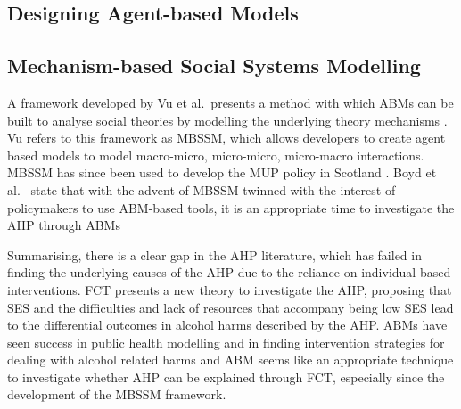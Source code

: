 \subsection{Designing Agent-based Models}



\subsection{Mechanism-based Social Systems Modelling}
A framework developed by Vu et al.~presents a method with which \ac{ABM}s can be built to analyse social theories by modelling the underlying theory mechanisms \cite{MBSSM}. Vu refers to this framework as \ac{MBSSM}, which allows developers to create agent based models to model macro-micro, micro-micro, micro-macro interactions. \ac{MBSSM} has since been used to develop the \ac{MUP} policy in Scotland \cite{mbssmCommentary, scotlandMUP}. Boyd et al.~ state that with the advent of \ac{MBSSM} twinned with the interest of policymakers to use \ac{ABM}-based tools, it is an appropriate time to investigate the \ac{AHP} through \ac{ABM}s \cite{Boyd2022, sipherIntro}

Summarising, there is a clear gap in the \ac{AHP} literature, which has failed in finding the underlying causes of the \ac{AHP} due to the reliance on individual-based interventions. \ac{FCT} presents a new theory to investigate the \ac{AHP},  proposing that \ac{SES} and the difficulties and lack of resources that accompany being low \ac{SES} lead to the differential outcomes in alcohol harms described by the \ac{AHP}. \ac{ABM}s have seen success in public health modelling and in finding intervention strategies for dealing with alcohol related harms and \ac{ABM} seems like an appropriate technique to investigate whether \ac{AHP} can be explained through \ac{FCT}, especially since the development of the \ac{MBSSM} framework. 


